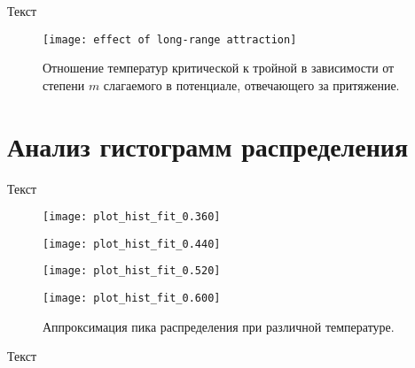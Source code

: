 Текст


\begin{figure}[htbp!]
\begin{center}
\texttt{[image: effect of long-range attraction]}
\caption{Отношение температур критической к тройной в зависимости от степени $m$ слагаемого в потенциале, отвечающего за притяжение.}
\label{ris10}
\end{center}
\end{figure}


\section{Анализ гистограмм распределения}\label{C2_3}

Текст

\begin{figure}[htbp!]
\begin{center}
\begin{minipage}[h]{0.45\linewidth}
\texttt{[image: plot\_hist\_fit\_0.360]}
\end{minipage}
\begin{minipage}[h]{0.45\linewidth}
\texttt{[image: plot\_hist\_fit\_0.440]}
\end{minipage}


\begin{minipage}[h]{0.45\linewidth}
\texttt{[image: plot\_hist\_fit\_0.520]}
\end{minipage}
\begin{minipage}[h]{0.45\linewidth}
\texttt{[image: plot\_hist\_fit\_0.600]}
\end{minipage}
\caption{Аппроксимация пика распределения при различной температуре.}
\label{ris11}
\end{center}
\end{figure}

Текст


